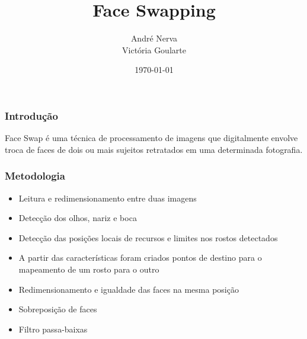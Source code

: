 \documentclass{beamer}
\title[Introdução ao Processamento de Imagens]{Face Swapping} %
\author{André Nerva \\ Victória Goularte} %
\institute[UnB] %
{
Universidade de Brasília  \\ %
\medskip

}
\date{\today} %
\begin{document}
\begin{frame}
\titlepage %
\end{frame}



\begin{frame}
\frametitle{Introdução}
\centering
Face Swap é uma técnica de processamento de imagens  que digitalmente envolve troca de faces de dois ou mais sujeitos retratados em uma determinada fotografia.
\end{frame}


\begin{frame}
\frametitle{Metodologia}
\begin{itemize}
\item Leitura e redimensionamento entre duas imagens
\item Detecção dos olhos, nariz e boca 
\item Detecção das posições locais de recursos e limites nos rostos detectados
\item A partir das características foram criados pontos de destino para o mapeamento de um rosto para o outro
\item Redimensionamento e igualdade das faces na mesma posição
\item Sobreposição de faces
\item Filtro passa-baixas
\end{itemize}
\end{frame}

\end{document}
